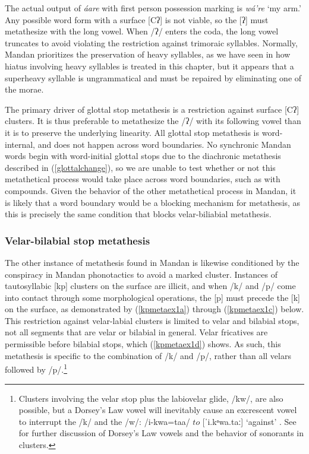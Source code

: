 The actual output of \textit{áare} with first person possession marking is \textit{wá're} `my arm.' Any possible word form with a surface [Cʔ] is not viable, so the [ʔ] must metathesize with the long vowel. When /ʔ/ enters the coda, the long vowel truncates to avoid violating the restriction against trimoraic syllables. Normally, Mandan prioritizes the preservation of heavy syllables, as we have seen in how hiatus involving heavy syllables is treated in this chapter, but it appears that a superheavy syllable is ungrammatical and must be repaired by eliminating one of the morae.

The primary driver of glottal stop metathesis is a restriction against surface [Cʔ] clusters. It is thus preferable to metathesize the /ʔ/ with its following vowel than it is to preserve the underlying linearity. All glottal stop metathesis is word-internal, and does not happen across word boundaries. No synchronic Mandan words begin with word-initial glottal stops due to the diachronic metathesis described in (\ref{glottalchange}), so we are unable to test whether or not this metathetical process would take place across word boundaries, such as with compounds. Given the behavior of the other metathetical process in Mandan, it is likely that a word boundary would be a blocking mechanism for metathesis, as this is precisely the same condition that blocks velar-biliabial metathesis.


\subsubsection{Velar-bilabial stop metathesis}\label{velarlabialmetathesis}

The other instance of metathesis found in Mandan is likewise conditioned by the conspiracy in Mandan phonotactics to avoid a marked cluster. Instances of tautosyllabic [kp] clusters on the surface are illicit, and when /k/ and /p/ come into contact through some morphological operations, the [p] must precede the [k] on the surface, as demonstrated by (\ref{kpmetaex1a}) through (\ref{kpmetaex1c}) below. This restriction against velar-labial clusters is limited to velar and bilabial stops, not all segments that are velar or bilabial in general. Velar fricatives are permissible before bilabial stops, which (\ref{kpmetaex1d}) shows. As such, this metathesis is specific to the combination of /k/ and /p/, rather than all velars followed by /p/.\footnote{Clusters involving the velar stop plus the labiovelar glide, /kw/, are also possible, but a Dorsey's Law vowel will inevitably cause an excrescent vowel to interrupt the /k/ and the /w/: /i-kwa=taa/ $to$ [ˈi.kᵃwa.taː] `against' \citep[125]{hollow1970}. See  for further discussion of Dorsey's Law vowels and the behavior of sonorants in clusters.}

